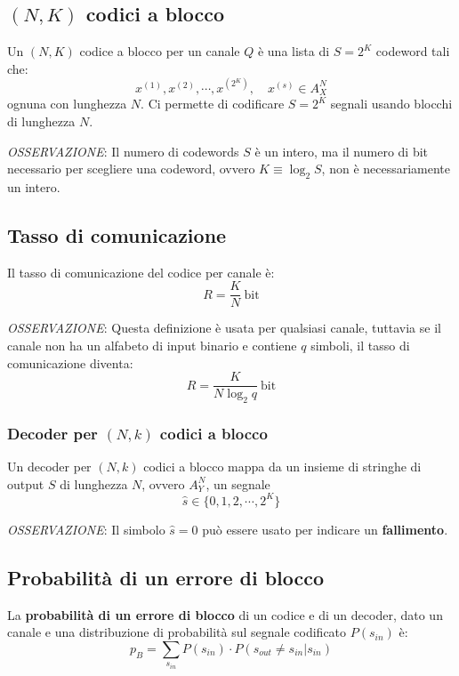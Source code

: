 \subsection{$(N,K)$ codici a blocco}
Un $(N,K)$ codice a blocco per un canale $Q$ è una lista di $S=2^K$ codeword tali che:
\begin{equation}
	{x^{(1)}, x^{(2)}, \cdots, x^{(2^K)}}, \quad x^{(s)}\in A_X^N
\end{equation}
ognuna con lunghezza $N$. Ci permette di codificare $S = 2^K$ segnali usando blocchi di lunghezza $N$.

\textit{OSSERVAZIONE}: Il numero di codewords $S$ è un intero, ma il numero di bit necessario per scegliere una codeword, ovvero $K\equiv \log_2 S$, non è necessariamente un intero.

\subsection{Tasso di comunicazione}
Il tasso di comunicazione del codice per canale è:
\begin{equation}
	R = \frac{K}{N}\ \text{bit}
\end{equation}

\textit{OSSERVAZIONE}: Questa definizione è usata per qualsiasi canale, tuttavia se il canale non ha un alfabeto di input binario e contiene $q$ simboli, il tasso di comunicazione diventa:
\begin{equation}
	R = \frac{K}{N \log_{2} q}\ \text{bit} 
\end{equation}

\subsubsection{Decoder per $(N,k)$ codici a blocco}
Un decoder per $(N,k)$ codici a blocco mappa da un insieme di stringhe di output $S$ di lunghezza $N$, ovvero $A_Y^N$, un segnale $$\hat{s} \in \{0,1,2,\cdots,2^K\}$$

\textit{OSSERVAZIONE}: Il simbolo $\hat{s} = 0$ può essere usato per indicare un \textbf{fallimento}.

\subsection{Probabilità di un errore di blocco}
La \textbf{probabilità di un errore di blocco} di un codice e di un decoder, dato un canale e una distribuzione di probabilità sul segnale codificato $P(s_{in})$ è:
\begin{equation}
	p_B = \sum_{s_{in}} P(s_{in})\cdot P(s_{out} \neq s_{in}|s_{in})
\end{equation}


